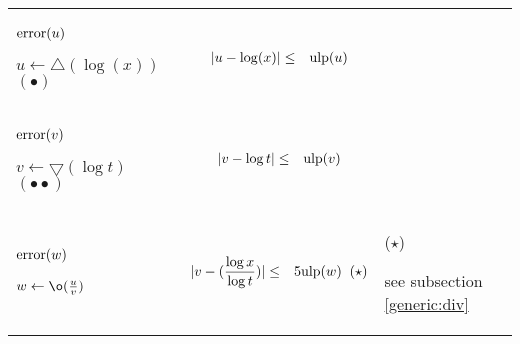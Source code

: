 \documentclass[12pt]{amsart}
\def\pinf{\bigtriangleup}
\def\minf{\bigtriangledown}
\def\ulp{{\rm ulp}}
\begin{document}
\begin{center}
\begin{tabular}{l l l}

\begin{minipage}{2.5cm}


${\textnormal{error}}(u)$


$u \leftarrow \pinf(\log(x))$
$(\bullet)$
\end{minipage} &
\begin{minipage}{7.5cm}

\begin{eqnarray}\nonumber
  |u-\log(x)| &\leq& \ulp(u)
\end{eqnarray}

\end{minipage} &
\begin{minipage}{6cm}

\end{minipage}\\%
\begin{minipage}{2.5cm}
${\textnormal{error}}(v)$


$v \leftarrow \minf(\log{t}) $
$(\bullet\bullet)$
\end{minipage} &
\begin{minipage}{7.5cm}

\begin{eqnarray}\nonumber
  |v-{\log t}| &\leq& \ulp(v)
\end{eqnarray}

\end{minipage} &
\begin{minipage}{6cm}
\end{minipage}\\%
\begin{minipage}{2.5cm}
${\textnormal{error}}(w)$


$w \leftarrow \o(\frac{u}{v}) $

\end{minipage} &
\begin{minipage}{7.5cm}

\begin{eqnarray}\nonumber
  |v-(\frac{\log x}{\log t})| &\leq& 5 \ulp(w) \;\;(\star)
\end{eqnarray}


\end{minipage} &
\begin{minipage}{6cm}
($\star$)

see subsection \ref{generic:div}

\end{minipage}

\end{tabular}
\end{center}
\end{document}
